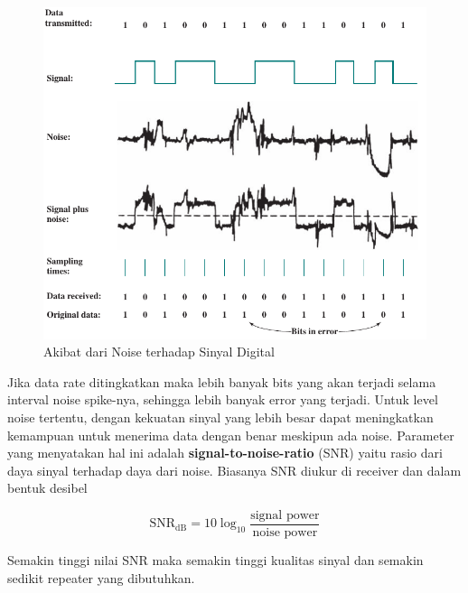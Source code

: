 \begin{figure}
	\centering
	\includegraphics[width=1\linewidth]{gambar/3.4.gambar.3.15.akibat_noise_pada_sinyal_digital}
	\caption{Akibat dari Noise terhadap Sinyal Digital}
	\label{fig.aklibat_noise}
\end{figure}

Jika data rate ditingkatkan maka lebih banyak bits yang akan terjadi selama interval noise spike-nya, sehingga lebih banyak error yang terjadi. Untuk level noise tertentu, dengan kekuatan sinyal yang lebih besar dapat meningkatkan kemampuan untuk menerima data dengan benar meskipun ada noise. Parameter yang menyatakan hal ini adalah \textbf{signal-to-noise-ratio} (SNR) yaitu rasio dari daya sinyal terhadap daya dari noise. Biasanya SNR diukur di receiver dan dalam bentuk desibel

\begin{equation}
	\text{SNR}_{\text{dB}} = 10 \log_{10} \frac{\text{signal power}}{\text{noise power}}
\end{equation}

Semakin tinggi nilai SNR maka semakin tinggi kualitas sinyal dan semakin sedikit repeater yang dibutuhkan.